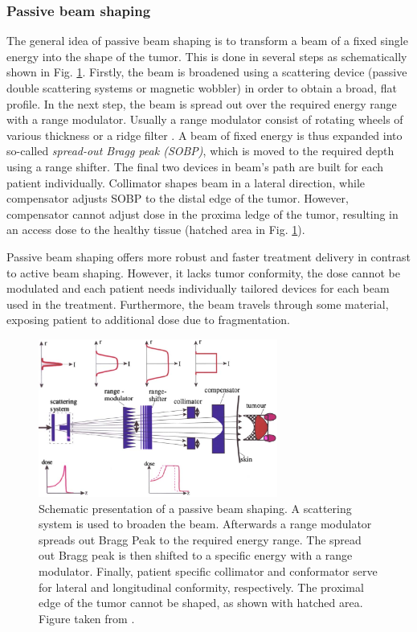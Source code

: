 \subsubsection{Passive beam shaping}
\label{Sec::Passive}

The general idea of passive beam shaping is to transform a beam of a fixed single energy into the shape of the tumor. This is done in several steps as schematically shown in Fig. \ref{passive}. Firstly, the beam is broadened using a scattering device (passive double scattering systems or magnetic wobbler)
in order to obtain a broad, flat profile. In the next step, the beam is spread out over the required energy range with a range modulator. Usually a range modulator consist of rotating wheels of various thickness or a ridge filter \cite{Chu1993}. A beam of fixed energy is thus expanded into so-called \textit{spread-out Bragg peak (SOBP)}, which is moved to the required depth using a range shifter. The final two devices in beam's path are built for each patient individually. Collimator shapes beam in a lateral direction, while compensator adjusts SOBP to the distal edge of the tumor. However, compensator cannot adjust dose in the proxima ledge of the tumor, resulting in an access dose to the healthy tissue (hatched area in Fig. \ref{passive}).
 
Passive beam shaping offers more robust and faster treatment delivery in contrast to active beam shaping. However, it lacks tumor conformity, the dose cannot be modulated and each patient needs individually tailored devices for each beam used in the treatment.
 Furthermore, the beam travels through some material, exposing patient to additional dose due to fragmentation.

 \newpage
 
\begin{figure}[H]
\begin{center}
\includegraphics[width=0.7\textwidth]{./Fundamentals/Images/deliverypassive.png}
\caption{Schematic presentation of a passive beam shaping. A scattering system is used to broaden the beam. Afterwards a range modulator spreads out Bragg Peak to the required energy range.
The spread out Bragg peak is then shifted to a specific energy with a range modulator. Finally, patient specific collimator and conformator serve for lateral and longitudinal conformity, respectively.
The proximal edge of the tumor cannot be shaped, as shown with hatched area. Figure taken from \cite{Schardt2010}.}
\label{passive}
\end{center}
\end{figure}

